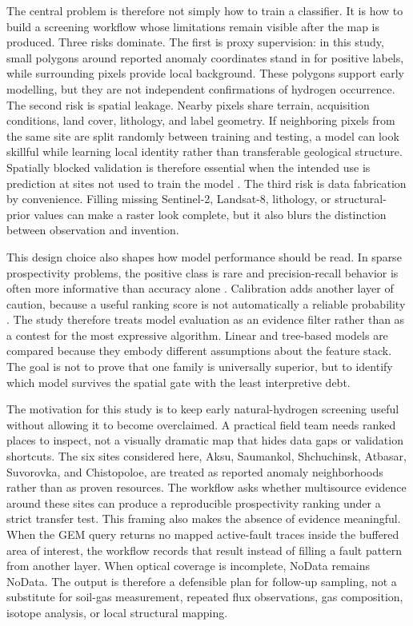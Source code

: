 \documentclass[numrefs]{interact}
\let\cite\citep
\theoremstyle{plain}%
\theoremstyle{definition}
\theoremstyle{remark}
\begin{document}
The central problem is therefore not simply how to train a classifier. It is how to build a screening workflow whose limitations remain visible after the map is produced. Three risks dominate. The first is proxy supervision: in this study, small polygons around reported anomaly coordinates stand in for positive labels, while surrounding pixels provide local background. These polygons support early modelling, but they are not independent confirmations of hydrogen occurrence. The second risk is spatial leakage. Nearby pixels share terrain, acquisition conditions, land cover, lithology, and label geometry. If neighboring pixels from the same site are split randomly between training and testing, a model can look skillful while learning local identity rather than transferable geological structure. Spatially blocked validation is therefore essential when the intended use is prediction at sites not used to train the model \cite{roberts2017crossvalidation,valavi2019blockcv}. The third risk is data fabrication by convenience. Filling missing Sentinel-2, Landsat-8, lithology, or structural-prior values can make a raster look complete, but it also blurs the distinction between observation and invention.

This design choice also shapes how model performance should be read. In sparse prospectivity problems, the positive class is rare and precision-recall behavior is often more informative than accuracy alone \cite{saito2015precision}. Calibration adds another layer of caution, because a useful ranking score is not automatically a reliable probability \cite{platt1999probabilistic}. The study therefore treats model evaluation as an evidence filter rather than as a contest for the most expressive algorithm. Linear and tree-based models are compared because they embody different assumptions about the feature stack. The goal is not to prove that one family is universally superior, but to identify which model survives the spatial gate with the least interpretive debt.

The motivation for this study is to keep early natural-hydrogen screening useful without allowing it to become overclaimed. A practical field team needs ranked places to inspect, not a visually dramatic map that hides data gaps or validation shortcuts. The six sites considered here, Aksu, Saumankol, Shchuchinsk, Atbasar, Suvorovka, and Chistopoloe, are treated as reported anomaly neighborhoods rather than as proven resources. The workflow asks whether multisource evidence around these sites can produce a reproducible prospectivity ranking under a strict transfer test. This framing also makes the absence of evidence meaningful. When the GEM query returns no mapped active-fault traces inside the buffered area of interest, the workflow records that result instead of filling a fault pattern from another layer. When optical coverage is incomplete, NoData remains NoData. The output is therefore a defensible plan for follow-up sampling, not a substitute for soil-gas measurement, repeated flux observations, gas composition, isotope analysis, or local structural mapping.
\end{document}
